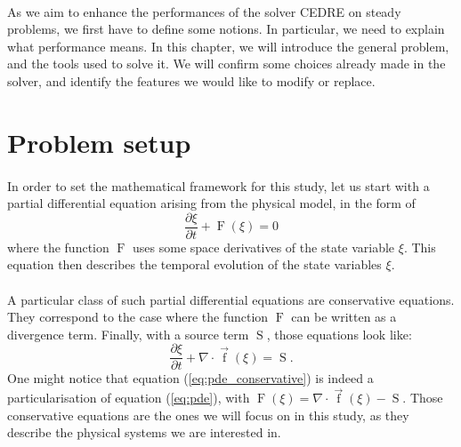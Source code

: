   \vspace{1cm}
  \paragraph{}
  As we aim to enhance the performances of the solver CEDRE on steady problems, we first have to define some notions.
  In particular, we need to explain what performance means.
  In this chapter, we will introduce the general problem, and the tools used to solve it.
  We will confirm some choices already made in the solver, and identify the features we would like to modify or replace.

  \pagebreak
  \section{Problem setup}

    \paragraph{}
    In order to set the mathematical framework for this study, let us start with a partial differential equation arising from the physical model, in the form of
    \begin{equation}\label{eq:pde}
      \frac{\partial \xi}{\partial t} + \operatorname{F}\left(\xi\right) = 0
    \end{equation}
    where the function $\operatorname{F}$ uses some space derivatives of the state variable $\xi$.
    This equation then describes the temporal evolution of the state variables $\xi$.

    \paragraph{}
    A particular class of such partial differential equations are conservative equations.
    They correspond to the case where the function $\operatorname{F}$ can be written as a divergence term.
    Finally, with a source term $\operatorname{S}$, those equations look like:
    \begin{equation}\label{eq:pde_conservative}
      \frac{\partial \xi}{\partial t} + \nabla \cdot \vec{\operatorname{f}}\left(\xi\right) = \operatorname{S}.
    \end{equation}
    One might notice that equation (\ref{eq:pde_conservative}) is indeed a particularisation of equation (\ref{eq:pde}), with $\operatorname{F}\left(\xi\right) = \nabla\cdot \vec{\operatorname{f}}\left(\xi\right) - \operatorname{S}$.
    Those conservative equations are the ones we will focus on in this study, as they describe the physical systems we are interested in.

